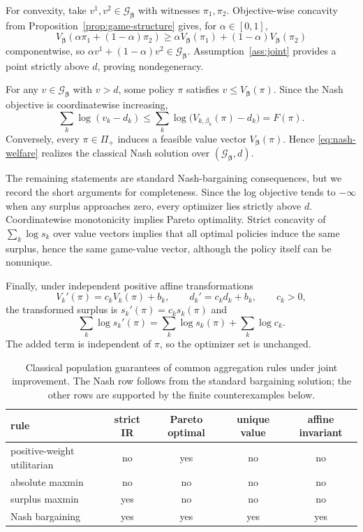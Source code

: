 \documentclass{article}
\theoremstyle{remark}
\theoremstyle{plain}
\newcommand{\G}{\mathcal{G}}
\begin{document}
For convexity, take $v^1,v^2\in\G_{\boldsymbol\beta}$ with witnesses $\pi_1,\pi_2$. Objective-wise concavity from Proposition~\ref{prop:game-structure} gives, for $\alpha\in[0,1]$,
\[
V_{\boldsymbol\beta}(\alpha\pi_1+(1-\alpha)\pi_2)
\ge
\alpha V_{\boldsymbol\beta}(\pi_1)+(1-\alpha)V_{\boldsymbol\beta}(\pi_2)
\]
componentwise, so $\alpha v^1+(1-\alpha)v^2\in\G_{\boldsymbol\beta}$. Assumption~\ref{ass:joint} provides a point strictly above $d$, proving nondegeneracy.

For any $v\in\G_{\boldsymbol\beta}$ with $v>d$, some policy $\pi$ satisfies $v\le V_{\boldsymbol\beta}(\pi)$. Since the Nash objective is coordinatewise increasing,
\[
\sum_k\log(v_k-d_k)
\le
\sum_k\log\bigl(V_{k,\beta_k}(\pi)-d_k\bigr)
=F(\pi).
\]
Conversely, every $\pi\in\Pi_+$ induces a feasible value vector $V_{\boldsymbol\beta}(\pi)$. Hence \eqref{eq:nash-welfare} realizes the classical Nash solution over $(\G_{\boldsymbol\beta},d)$.

The remaining statements are standard Nash-bargaining consequences, but we record the short arguments for completeness. Since the log objective tends to $-\infty$ when any surplus approaches zero, every optimizer lies strictly above $d$. Coordinatewise monotonicity implies Pareto optimality. Strict concavity of $\sum_k\log s_k$ over value vectors implies that all optimal policies induce the same surplus, hence the same game-value vector, although the policy itself can be nonunique.

Finally, under independent positive affine transformations
\[
V_k'(\pi)=c_kV_k(\pi)+b_k,
\qquad
d_k'=c_kd_k+b_k,
\qquad c_k>0,
\]
the transformed surplus is $s_k'(\pi)=c_ks_k(\pi)$ and
\[
\sum_k\log s_k'(\pi)
=
\sum_k\log s_k(\pi)+\sum_k\log c_k.
\]
The added term is independent of $\pi$, so the optimizer set is unchanged.

\begin{table}[htbp]
\centering\footnotesize
\setlength{\tabcolsep}{4.2pt}
\caption{Classical population guarantees of common aggregation rules under joint improvement. The Nash row follows from the standard bargaining solution; the other rows are supported by the finite counterexamples below.}
\label{tab:rule-guarantees}
\begin{tabular}{lcccc}
\toprule
rule & strict IR & Pareto optimal & unique value & affine invariant\\
\midrule
positive-weight utilitarian & no & yes & no & no\\
absolute maxmin & no & no & no & no\\
surplus maxmin & yes & no & no & no\\
Nash bargaining & yes & yes & yes & yes\\
\bottomrule
\end{tabular}
\end{table}
\end{document}
